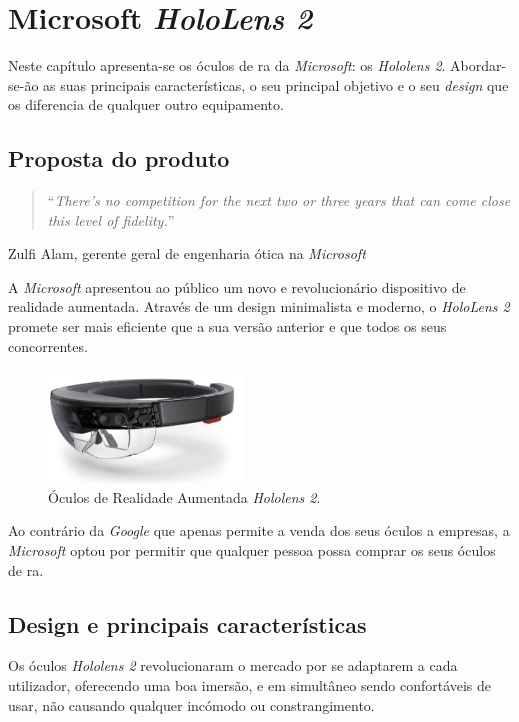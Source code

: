 \documentclass{report}
\begin{document}
\chapter{Microsoft \textit{HoloLens 2}}
\label{chap.microsoft-hololens-2}
Neste capítulo apresenta-se os óculos de \ac{ra} da \textit{Microsoft}: os \textit{Hololens 2}. Abordar-se-ão as suas principais características, o seu principal objetivo e o seu \textit{design} que os diferencia de qualquer outro equipamento.

\section{Proposta do produto}
\begin{quote}
    ``\emph{There’s no competition for the next two or three years that can come close this level of fidelity.}''\cite{bohn_2019}
\end{quote}
\begin{flushright}
    Zulfi Alam, gerente geral de engenharia ótica na \textit{Microsoft}
\end{flushright}

A \textit{Microsoft} apresentou ao público um novo e revolucionário dispositivo de realidade aumentada. Através de um design minimalista e moderno, o \textit{HoloLens 2} promete ser mais eficiente que a sua versão anterior e que todos os seus concorrentes.

\begin{figure}[H]
    \centering
    \includegraphics[width=14em]{hololens2.png}
    \caption{Óculos de Realidade Aumentada \textit{Hololens 2}.}
    \label{Fig:hololens2}
\end{figure}


Ao contrário da \textit{Google} que apenas permite a venda dos seus óculos a empresas, a \textit{Microsoft} optou por permitir que qualquer pessoa possa comprar os seus óculos de \ac{ra}.

\section{Design e principais características}
Os óculos \textit{Hololens 2} revolucionaram o mercado por se adaptarem a cada utilizador, oferecendo uma boa imersão, e em simultâneo sendo confortáveis de usar, não causando qualquer incómodo ou constrangimento.
\end{document}
